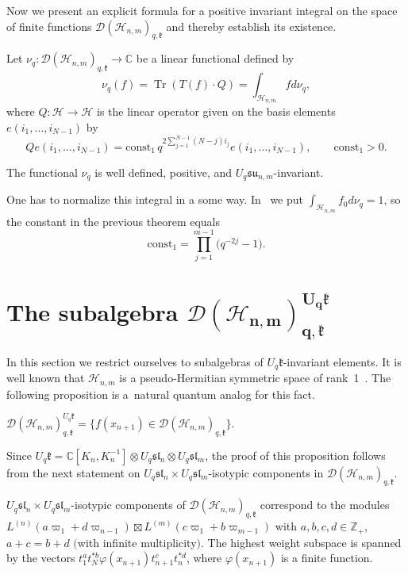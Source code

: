 Now we present an explicit formula for a positive invariant integral on the space of f\/inite functions
$\mathscr{D}(\mathscr{H}_{n,m})_{q,\mathfrak{k}}$ and thereby establish its existence.

Let $\nu_q:\mathscr{D}(\mathscr{H}_{n,m})_{q,\mathfrak{k}} \to\mathbb{C}$ be a linear functional def\/ined by
\[
\nu_q(f)=\operatorname{Tr}(T(f)\cdot Q)=\int_{\mathscr{H}_{n,m}} fd\nu_q,
\]
where $Q:\mathscr{H}\to\mathscr{H}$ is the linear operator given on the basis elements
$e(i_1,\ldots,i_{N-1})$ by
\[
Qe(i_1,\ldots,i_{N-1})= \mathrm{const_1} \, q^{2\sum\limits_{j=1}^{N-1}(N-j)i_j}e(i_1,\ldots,i_{N-1}),
\qquad \mathrm{const_1}>0.
\]

\begin{theorem}
The functional $\nu_q$ is well defined, positive, and $U_{q}\mathfrak{su}_{n,m}$-invariant.
\end{theorem}

One has to normalize this integral in a some way. In~\cite{BS} we put $\int_{\mathscr{H}_{n,m}} f_0
d\nu_q=1$, so the constant in the previous theorem equals
\[
\mathrm{const_1}= \prod\limits_{j=1}^{m-1}\big(q^{-2j}-1\big).
\]



\section[The subalgebra $\mathscr{D}(\mathscr{H}_{n,m})_{q,\mathfrak{k}}^{U_q \mathfrak{k}}$]{The subalgebra $\boldsymbol{\mathscr{D}(\mathscr{H}_{n,m})_{q,\mathfrak{k}}^{U_q \mathfrak{k}}}$}\label{sec_4}

In this section we restrict ourselves to subalgebras of $U_q \mathfrak k$-invariant elements. It is well
known that $\mathscr{H}_{n,m}$ is a pseudo-Hermitian symmetric space of rank~1~\cite{Molch2}. The following
proposition is a~natural quantum analog for this fact.

\begin{proposition}
$\mathscr{D}(\mathscr{H}_{n,m})_{q,\mathfrak{k}}^{U_q \mathfrak{k}}=\{f(x_{n+1}) \in
\mathscr{D}(\mathscr{H}_{n,m})_{q,\mathfrak{k}}\}$.
\end{proposition}
Since $U_q \mathfrak{k}=\mathbb C[K_n,K_n^{-1}] \otimes U_q \mathfrak{sl}_n \otimes U_q \mathfrak{sl}_m$, the
proof of this proposition follows from the next statement on $U_q \mathfrak{sl}_n \times U_q
\mathfrak{sl}_m$-isotypic components in $\mathscr{D}(\mathscr{H}_{n,m})_{q,\mathfrak{k}}$.
\begin{proposition}
$U_q \mathfrak{sl}_n \times U_q \mathfrak{sl}_m$-isotypic components of
$\mathscr{D}(\mathscr{H}_{n,m})_{q,\mathfrak{k}}$ correspond to the modules $L^{(n)}(a\varpi_1+d\varpi_{n-1})
\boxtimes L^{(m)}(c\varpi_1 +b \varpi_{m-1})$ with $a,b,c,d \in \mathbb Z_+$, $a+c=b+d$ $($with infinite
multiplicity$)$. The highest weight subspace is spanned by the vectors
$t_1^at_N^{*b}\varphi(x_{n+1})t_{n+1}^ct_n^{*d}$, where $\varphi(x_{n+1})$ is a finite function.
\end{proposition}

